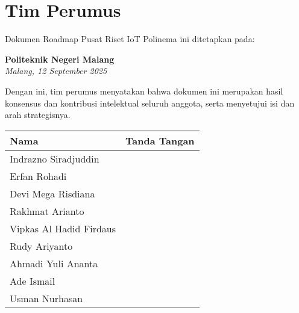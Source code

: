 \documentclass[12pt,a4paper]{article}
\begin{document}
\section{Tim Perumus}

Dokumen Roadmap Pusat Riset IoT Polinema ini ditetapkan pada:

\begin{center}
    \textbf{Politeknik Negeri Malang} \\
    \textit{Malang, 12 September 2025} \\
\end{center}

\noindent
Dengan ini, tim perumus menyatakan bahwa dokumen ini merupakan hasil konsensus dan kontribusi intelektual seluruh anggota, serta menyetujui isi dan arah strategisnya.

\vspace{2.2cm} %

\begin{tabular}{|p{5cm}|p{8cm}|}
    \hline
    \textbf{Nama}           & \textbf{Tanda Tangan} \\
    \hline
    Indrazno Siradjuddin    &                       \\[1.2cm] %
    \hline
    Erfan Rohadi            &                       \\[1.2cm]
    \hline
    Devi Mega Risdiana      &                       \\[1.2cm]
    \hline
    Rakhmat Arianto         &                       \\[1.2cm]
    \hline
    Vipkas Al Hadid Firdaus &                       \\[1.2cm]
    \hline
    Rudy Ariyanto           &                       \\[1.2cm]
    \hline
    Ahmadi Yuli Ananta      &                       \\[1.2cm]
    \hline
    Ade Ismail              &                       \\[1.2cm]
    \hline
    Usman Nurhasan          &                       \\[1.2cm]
    \hline
\end{tabular}

\vspace{2cm} %
\end{document}
